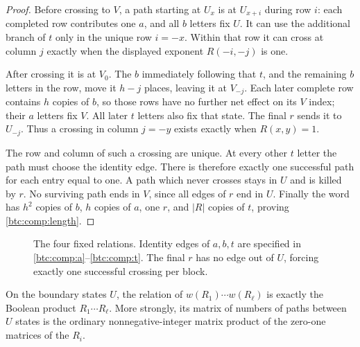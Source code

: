 \begin{proof}
Before crossing to $V$, a path starting at $U_x$ is at $U_{x+i}$
during row $i$: each completed row contributes one $a$, and all
$b$ letters fix $U$. It can use the additional branch of $t$
only in the unique row $i=-x$. Within that row it can cross at
column $j$ exactly when the displayed exponent $R(-i,-j)$ is one.

After crossing it is at $V_0$. The $b$ immediately following that
$t$, and the remaining $b$ letters in the row, move it $h-j$
places, leaving it at $V_{-j}$. Each later complete row contains
$h$ copies of $b$, so those rows have no further net effect on
its $V$ index; their $a$ letters fix $V$. All later $t$ letters
also fix that state. The final $r$ sends it to $U_{-j}$.
Thus a crossing in column $j=-y$ exists exactly when $R(x,y)=1$.

The row and column of such a crossing are unique. At every other
$t$ letter the path must choose the identity edge. There is
therefore exactly one successful path for each entry equal to one.
A path which never crosses stays in $U$ and is killed by $r$.
No surviving path ends in $V$, since all edges of $r$ end in $U$.
Finally the word has $h^2$ copies of $b$, $h$ copies of $a$,
one $r$, and $|R|$ copies of $t$, proving \eqref{btc:comp:length}.
\end{proof}

\begin{figure}[tb]
\centering
{}
\caption{The four fixed relations. Identity edges of $a,b,t$ are
specified in \eqref{btc:comp:a}--\eqref{btc:comp:t}. The final $r$ has no
edge out of $U$, forcing exactly one successful crossing per block.}
\label{btc:comp:register-figure}
\end{figure}

\begin{corollary}\label{btc:comp:products}
On the boundary states $U$, the relation of
$w(R_1)\cdots w(R_\ell)$ is exactly the Boolean product
$R_1\cdots R_\ell$. More strongly, its matrix of numbers of paths
between $U$ states is the ordinary nonnegative-integer matrix product
of the zero-one matrices of the $R_i$.
\end{corollary}

